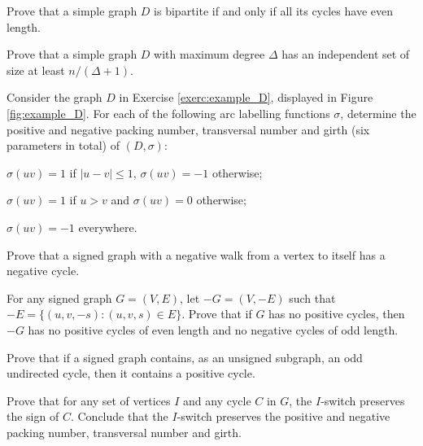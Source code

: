 \documentclass[a4paper, 11pt]{book}
\numberwithin{equation}{section}
\theoremstyle{plain}
\renewcommand{\(}{\ldbrack}
\renewcommand{\)}{\rdbrack}
\begin{document}
\begin{exercises}
\item Prove that a simple graph $D$ is bipartite if and only if all its cycles have even length.

\item \label{exerc:independence_max_degree} Prove that a simple graph $D$ with maximum degree $\Delta$ has an independent set of size at least $n/(\Delta + 1)$.









\item Consider the graph $D$ in Exercise \ref{exerc:example_D}, displayed in Figure \ref{fig:example_D}. For each of the following arc labelling functions $\sigma$, determine the positive and negative packing number, transversal number and girth (six parameters in total) of $(D, \sigma)$:
\begin{exercises}
	\item $\sigma(uv) = 1$ if $|u - v| \le 1$, $\sigma(uv) = -1$ otherwise;
	
	\item $\sigma(uv) = 1$ if $u > v$ and $\sigma(uv) = 0$ otherwise;
	
	\item $\sigma(uv) = -1$ everywhere.	
\end{exercises}


\item Prove that a signed graph with a negative walk from a vertex to itself has a negative cycle.


\item For any signed graph $G=(V,E)$, let $-G=(V,-E)$ such that $-E = \{ (u,v,-s) : (u,v,s) \in E \}$. Prove that if $G$ has no positive cycles, then $-G$ has no positive cycles of even length and no negative cycles of odd length.

\item Prove that if a signed graph contains, as an unsigned subgraph, an odd undirected cycle, then it contains a positive cycle.

\item Prove that for any set of vertices $I$ and any cycle $C$ in $G$, the $I$-switch preserves the sign of $C$. Conclude that the $I$-switch preserves the positive and negative packing number, transversal number and girth.


\end{exercises}
\end{document}
